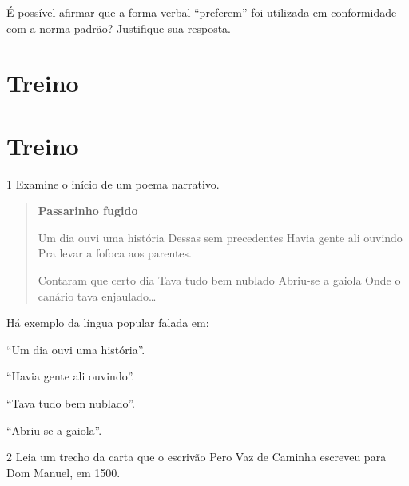 É possível afirmar que a forma verbal ``preferem'' foi utilizada em conformidade com a norma-padrão? Justifique sua resposta.

\section{Treino}


\section{Treino}

\num{1} Examine o início de um poema narrativo.


\begin{quote}
\textbf{Passarinho fugido}

Um dia ouvi uma história Dessas sem precedentes Havia gente ali ouvindo
Pra levar a fofoca aos parentes.

Contaram que certo dia Tava tudo bem nublado Abriu-se a gaiola Onde o
canário tava enjaulado\ldots{}

\end{quote}

Há exemplo da língua popular falada em:

\begin{escolha}
\item ``Um dia ouvi uma história''.

\item ``Havia gente ali ouvindo''.

\item ``Tava tudo bem nublado''.

\item ``Abriu-se a gaiola''.

\end{escolha}

\num{2} Leia um trecho da carta que o escrivão Pero Vaz de Caminha escreveu para Dom Manuel, em 1500.

